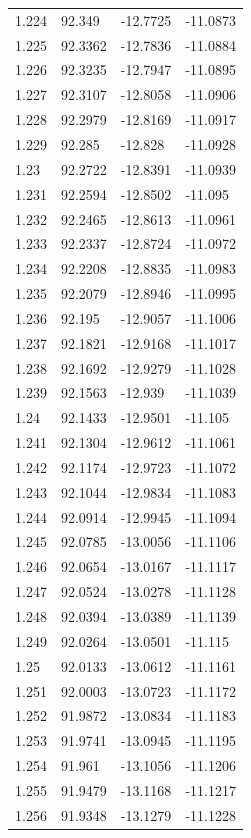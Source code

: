 \begin{tabular}{llll}
1.224 & 92.349 & -12.7725 & -11.0873 \\
1.225 & 92.3362 & -12.7836 & -11.0884 \\
1.226 & 92.3235 & -12.7947 & -11.0895 \\
1.227 & 92.3107 & -12.8058 & -11.0906 \\
1.228 & 92.2979 & -12.8169 & -11.0917 \\
1.229 & 92.285 & -12.828 & -11.0928 \\
1.23 & 92.2722 & -12.8391 & -11.0939 \\
1.231 & 92.2594 & -12.8502 & -11.095 \\
1.232 & 92.2465 & -12.8613 & -11.0961 \\
1.233 & 92.2337 & -12.8724 & -11.0972 \\
1.234 & 92.2208 & -12.8835 & -11.0983 \\
1.235 & 92.2079 & -12.8946 & -11.0995 \\
1.236 & 92.195 & -12.9057 & -11.1006 \\
1.237 & 92.1821 & -12.9168 & -11.1017 \\
1.238 & 92.1692 & -12.9279 & -11.1028 \\
1.239 & 92.1563 & -12.939 & -11.1039 \\
1.24 & 92.1433 & -12.9501 & -11.105 \\
1.241 & 92.1304 & -12.9612 & -11.1061 \\
1.242 & 92.1174 & -12.9723 & -11.1072 \\
1.243 & 92.1044 & -12.9834 & -11.1083 \\
1.244 & 92.0914 & -12.9945 & -11.1094 \\
1.245 & 92.0785 & -13.0056 & -11.1106 \\
1.246 & 92.0654 & -13.0167 & -11.1117 \\
1.247 & 92.0524 & -13.0278 & -11.1128 \\
1.248 & 92.0394 & -13.0389 & -11.1139 \\
1.249 & 92.0264 & -13.0501 & -11.115 \\
1.25 & 92.0133 & -13.0612 & -11.1161 \\
1.251 & 92.0003 & -13.0723 & -11.1172 \\
1.252 & 91.9872 & -13.0834 & -11.1183 \\
1.253 & 91.9741 & -13.0945 & -11.1195 \\
1.254 & 91.961 & -13.1056 & -11.1206 \\
1.255 & 91.9479 & -13.1168 & -11.1217 \\
1.256 & 91.9348 & -13.1279 & -11.1228 \\

\end{tabular}
